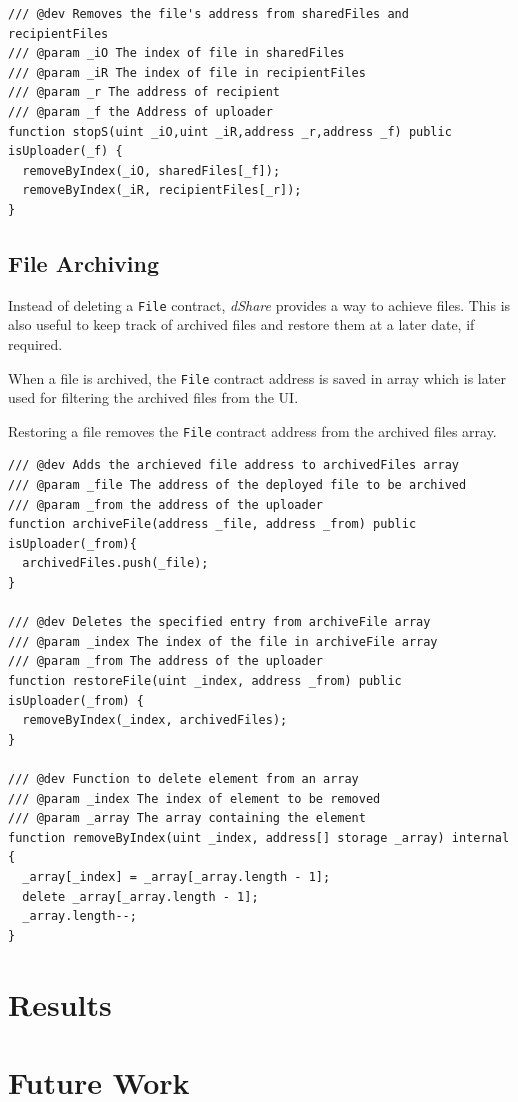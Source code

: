 \documentclass[]{article}
\begin{document}
\begin{verbatim}
/// @dev Removes the file's address from sharedFiles and recipientFiles
/// @param _iO The index of file in sharedFiles
/// @param _iR The index of file in recipientFiles
/// @param _r The address of recipient
/// @param _f the Address of uploader
function stopS(uint _iO,uint _iR,address _r,address _f) public isUploader(_f) {
  removeByIndex(_iO, sharedFiles[_f]);
  removeByIndex(_iR, recipientFiles[_r]);
}
\end{verbatim}
		
		\newpage
		\subsection{File Archiving}
		Instead of deleting a \texttt{File} contract, \textit{dShare} provides a way to achieve files. This is also useful to keep track of archived files and restore them at a later date, if required.
		
		When a file is archived, the \texttt{File} contract address is saved in array which is later used for filtering the archived files from the UI.
		
		Restoring a file removes the \texttt{File} contract address from the archived files array.
		
\begin{verbatim}
/// @dev Adds the archieved file address to archivedFiles array
/// @param _file The address of the deployed file to be archived
/// @param _from the address of the uploader
function archiveFile(address _file, address _from) public isUploader(_from){
  archivedFiles.push(_file);
}

/// @dev Deletes the specified entry from archiveFile array
/// @param _index The index of the file in archiveFile array
/// @param _from The address of the uploader
function restoreFile(uint _index, address _from) public isUploader(_from) {
  removeByIndex(_index, archivedFiles);
}

/// @dev Function to delete element from an array
/// @param _index The index of element to be removed
/// @param _array The array containing the element
function removeByIndex(uint _index, address[] storage _array) internal {
  _array[_index] = _array[_array.length - 1];
  delete _array[_array.length - 1];
  _array.length--;
}
\end{verbatim}
	
	\newpage
	\section{Results}
	
	\newpage
	\section{Future Work}
	
	\newpage
	
	
\end{document}
